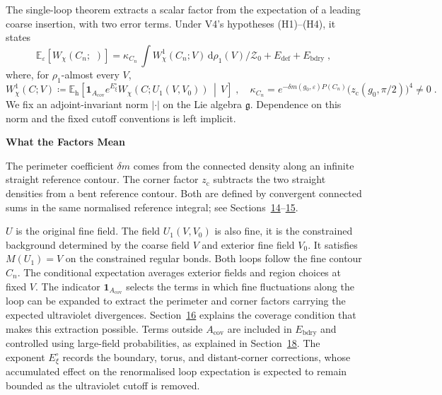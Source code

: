 \documentclass[11pt,a4paper]{article}
\makeatletter
\newcommand{\dd}{\mathrm{d}}
\newcommand{\id}{\mathbf 1}
\newcommand{\Eh}{\mathbb E_{\mathrm h}}
\newcommand*{\bigcdot}{}%
\DeclareRobustCommand*{\bigcdot}{%
  \mathbin{\mathpalette\bigcdot@{}}%
}
\newcommand*{\bigcdot@scalefactor}{.7}
\newcommand*{\bigcdot@widthfactor}{1.15}
\newcommand*{\bigcdot@}[2]{%
  \sbox0{$#1\vcenter{}$}%
  \sbox2{$#1\cdot\m@th$}%
  \hbox to \bigcdot@widthfactor\wd2{%
    \hfil
    \raise\ht0\hbox{%
      \scalebox{\bigcdot@scalefactor}{%
        \lower\ht0\hbox{$#1\bullet\m@th$}%
      }%
    }%
    \hfil
  }%
}
\newcommand{\subhead}[1]{\par\vspace{4pt}\textbf{\color{ink}#1}\par}
\makeatother
\begin{document}
The single-loop theorem extracts a scalar factor from the expectation of a leading coarse insertion, with two error terms. Under V4's hypotheses (H1)--(H4), it states
\begin{equation*}
        \mathbb E_\varepsilon[W_\chi(C_n; \, \bigcdot \, )] =\kappa_{C_n}\, \int W^1_{\chi}(C_n;V) \, \dd \rho_1(V)/\mathcal Z_0  +E_{\mathrm{def}}+E_{\mathrm{bdry}}\;,
\end{equation*}
where, for $\rho_1$-almost every $V$,
\begin{equation*}
    W^1_{\chi}(C;V)\coloneqq \Eh\!\left[\id_{A_{\mathrm{cov}}}
        e^{E^\circ_\xi}W_\chi(C;U_1(V,V_0))
        \,\middle|\,V\right]\;,
    \quad
    \kappa_{C_n}
        =e^{-\delta m(g_0,\varepsilon)P(C_n)}
            \bigl(z_{\mathrm c}(g_0,\pi/2)\bigr)^4
        \neq 0\;.
\end{equation*}
We fix an adjoint-invariant norm $|\cdot|$ on the Lie algebra $\mathfrak g$. Dependence on this norm and the fixed cutoff conventions is left implicit.

\subhead{What the Factors Mean}
The perimeter coefficient $\delta m$ comes from the connected density along an infinite straight reference contour. The corner factor $z_{\mathrm c}$ subtracts the two straight densities from a bent reference contour. Both are defined by convergent connected sums in the same normalised reference integral; see Sections~\hyperref[summary:14]{14}--\hyperref[summary:15]{15}.

$U$ is the original fine field. The field $U_1(V,V_0)$ is also fine, it is the constrained background determined by the coarse field $V$ and exterior fine field $V_0$. It satisfies $M(U_1)=V$ on the constrained regular bonds. Both loops follow the fine contour $C_n$. The conditional expectation averages exterior fields and region choices at fixed $V$. The indicator $\id_{A_{\mathrm{cov}}}$ selects the terms in which fine fluctuations along the loop can be expanded to extract the perimeter and corner factors carrying the expected ultraviolet divergences. Section~\hyperref[summary:16]{16} explains the coverage condition that makes this extraction possible. Terms outside $A_{\mathrm{cov}}$ are included in $E_{\mathrm{bdry}}$ and controlled using large-field probabilities, as explained in Section~\hyperref[summary:18]{18}. The exponent $E^\circ_\xi$ records the boundary, torus, and distant-corner corrections, whose accumulated effect on the renormalised loop expectation is expected to remain bounded as the ultraviolet cutoff is removed.
\end{document}
